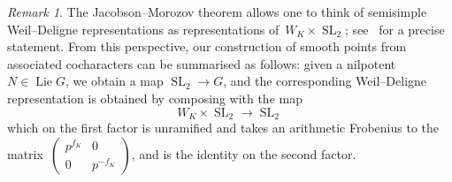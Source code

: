 \documentclass{amsart}
\renewcommand{\mathbb}{\mathbf}
\def\Ad{\mathrm{Ad}}
\DeclareMathOperator{\Lie}{Lie}
\DeclareMathOperator{\SL}{SL}
\def\ad{\mathrm{ad}}
\theoremstyle{definition}
\theoremstyle{remark}
\newtheorem{rem}[subsubsection]{Remark}
\newcommand{\mar}[1]{}
\newcommand{\mar}[1]{\marginpar{\raggedright\tiny squirrel #1}}
\newcommand{\GG}{{\mathbb G}}
\newcommand{\Gm}{\GG_m}
\begin{document}
\begin{rem}\label{rem: SL2 form of WD group}The
  Jacobson--Morozov theorem allows one to think of semisimple
  Weil--Deligne representations as representations
  of~$W_K\times\SL_2$; see~\cite[Prop.\ 2.2]{MR2730575} for a precise
  statement. From this perspective, our construction of smooth points
  from associated cocharacters can be summarised as follows: %
  given a nilpotent~$N\in\Lie G$, we obtain
  a map $\SL_2\to G$, and the corresponding Weil--Deligne
  representation is obtained by composing with the map
  \[W_K\times\SL_2\to\SL_2\] which on the first factor is unramified and
  takes an arithmetic Frobenius to the matrix~$
  \begin{pmatrix}
    p^{f_K}&0\\0& p^{-f_K}
  \end{pmatrix}
$, and is the identity on the second factor.
\end{rem}

\end{document}
